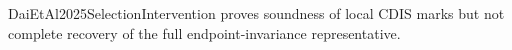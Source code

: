 DaiEtAl2025SelectionIntervention proves soundness of local CDIS marks but not complete recovery of the full endpoint-invariance representative.